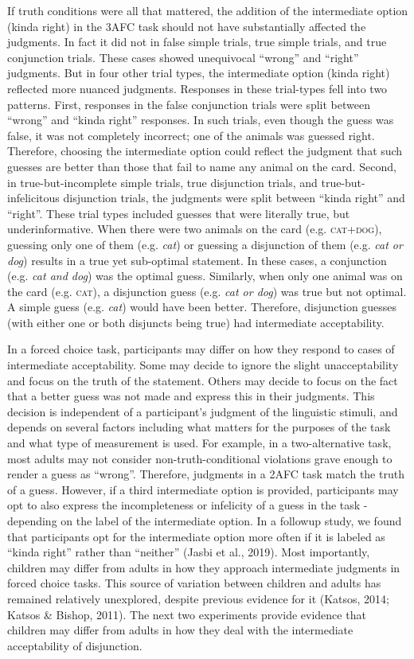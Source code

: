 \documentclass[,man,floatsintext]{apa6}
\begin{document}
If truth conditions were all that mattered, the addition of the intermediate option (kinda right) in the 3AFC task should not have substantially affected the judgments. In fact it did not in false simple trials, true simple trials, and true conjunction trials. These cases showed unequivocal \enquote{wrong} and \enquote{right} judgments. But in four other trial types, the intermediate option (kinda right) reflected more nuanced judgments.
Responses in these trial-types fell into two patterns. First, responses in the false conjunction trials were split between \enquote{wrong} and \enquote{kinda right} responses. In such trials, even though the guess was false, it was not completely incorrect; one of the animals was guessed right. Therefore, choosing the intermediate option could reflect the judgment that such guesses are better than those that fail to name any animal on the card. Second, in true-but-incomplete simple trials, true disjunction trials, and true-but-infelicitous disjunction trials, the judgments were split between \enquote{kinda right} and \enquote{right}. These trial types included guesses that were literally true, but underinformative. When there were two animals on the card (e.g. \textsc{cat+dog}), guessing only one of them (e.g. \emph{cat}) or guessing a disjunction of them (e.g. \emph{cat or dog}) results in a true yet sub-optimal statement. In these cases, a conjunction (e.g. \emph{cat and dog}) was the optimal guess. Similarly, when only one animal was on the card (e.g. \textsc{cat}), a disjunction guess (e.g. \emph{cat or dog}) was true but not optimal. A simple guess (e.g. \emph{cat}) would have been better. Therefore, disjunction guesses (with either one or both disjuncts being true) had intermediate acceptability.

In a forced choice task, participants may differ on how they respond to cases of intermediate acceptability. Some may decide to ignore the slight unacceptability and focus on the truth of the statement. Others may decide to focus on the fact that a better guess was not made and express this in their judgments. This decision is independent of a participant's judgment of the linguistic stimuli, and depends on several factors including what matters for the purposes of the task and what type of measurement is used. For example, in a two-alternative task, most adults may not consider non-truth-conditional violations grave enough to render a guess as \enquote{wrong}. Therefore, judgments in a 2AFC task match the truth of a guess. However, if a third intermediate option is provided, participants may opt to also express the incompleteness or infelicity of a guess in the task - depending on the label of the intermediate option. In a followup study, we found that participants opt for the intermediate option more often if it is labeled as \enquote{kinda right} rather than \enquote{neither} (Jasbi et al., 2019). Most importantly, children may differ from adults in how they approach intermediate judgments in forced choice tasks. This source of variation between children and adults has remained relatively unexplored, despite previous evidence for it (Katsos, 2014; Katsos \& Bishop, 2011). The next two experiments provide evidence that children may differ from adults in how they deal with the intermediate acceptability of disjunction.
\end{document}
